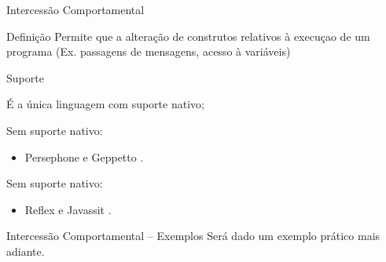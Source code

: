 \documentclass[12pt,t]{beamer}
\begin{document}
 	 \begin{frame}{Intercessão Comportamental}
 	 	\begin{block}{Definição \cite{denker2008sub}}
 	 		Permite que a alteração de construtos relativos à execuçao de um programa (Ex. passagens de mensagens, acesso à variáveis)
 	 	\end{block} 
 	 	\pause		 	 	 	
 		\begin{block}{Suporte}
 			\begin{description}  [Smalltalk:] 
	 			\item [CLOS:] É a única linguagem com suporte nativo;
	 			\pause
	 			\item [Smalltalk:] Sem suporte nativo: 
	 			\begin{itemize}
	 				\item Persephone e Geppetto \cite{marschall2006taking,rothlisberger2006geppetto}.
	 			\end{itemize}
	 			\pause
	 			\item [Java:] Sem suporte nativo:
	 			\begin{itemize}
	 				\item Reflex e Javassit \cite{tanter2001reflex,chiba2000load}.
	 			\end{itemize}
	 		\end{description}
 	 	\end{block} 	 	 	 	
 	 \end{frame}
 	 \begin{frame}[c]{Intercessão Comportamental -- Exemplos}
 	 		\centering
 	 		\LARGE Será dado um exemplo prático mais adiante.
 	 \end{frame}
\end{document}
